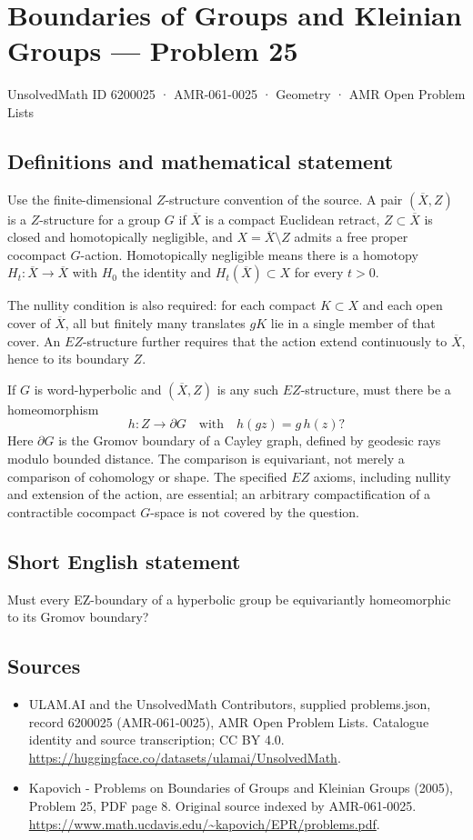\documentclass[11pt,a4paper]{article}
\begin{document}
\section*{Boundaries of Groups and Kleinian Groups — Problem 25}\label{6200025}
{\small UnsolvedMath ID 6200025 · AMR-061-0025 · Geometry · AMR Open Problem Lists}
\subsection{Definitions and mathematical statement}
Use the finite-dimensional $Z$-structure convention of the source. A pair $(\overline X,Z)$ is a $Z$-structure for a group $G$ if $\overline X$ is a compact Euclidean retract, $Z\subset\overline X$ is closed and homotopically negligible, and $X=\overline X\setminus Z$ admits a free proper cocompact $G$-action. Homotopically negligible means there is a homotopy $H_t:\overline X\to\overline X$ with $H_0$ the identity and $H_t(\overline X)\subset X$ for every $t>0$.

The nullity condition is also required: for each compact $K\subset X$ and each open cover of $\overline X$, all but finitely many translates $gK$ lie in a single member of that cover. An $EZ$-structure further requires that the action extend continuously to $\overline X$, hence to its boundary $Z$.

If $G$ is word-hyperbolic and $(\overline X,Z)$ is any such $EZ$-structure, must there be a homeomorphism
\[
 h:Z\longrightarrow\partial G\quad\text{with}\quad h(gz)=g\,h(z)?
\]
Here $\partial G$ is the Gromov boundary of a Cayley graph, defined by geodesic rays modulo bounded distance. The comparison is equivariant, not merely a comparison of cohomology or shape. The specified $EZ$ axioms, including nullity and extension of the action, are essential; an arbitrary compactification of a contractible cocompact $G$-space is not covered by the question.
\subsection{Short English statement}
Must every EZ-boundary of a hyperbolic group be equivariantly homeomorphic to its Gromov boundary?
\subsection{Sources}
\begin{itemize}
\item[S1] ULAM.AI and the UnsolvedMath Contributors, supplied problems.json, record 6200025 (AMR-061-0025), AMR Open Problem Lists. Catalogue identity and source transcription; CC BY 4.0.
\url{https://huggingface.co/datasets/ulamai/UnsolvedMath}.
\item[S2] Kapovich - Problems on Boundaries of Groups and Kleinian Groups (2005), Problem 25, PDF page 8. Original source indexed by AMR-061-0025.
\url{https://www.math.ucdavis.edu/~kapovich/EPR/problems.pdf}.
\end{itemize}
\end{document}
